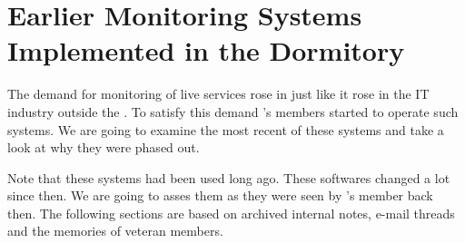 %

\chapter{Earlier Monitoring Systems Implemented in the Dormitory \label{ch1}}

The demand for monitoring of live services rose in \kszkfull just like it rose
in the IT industry outside the \schfull. To satisfy this demand \kszk's members
started to operate such systems. We are going to examine the most recent of
these systems and take a look at why they were phased out.

Note that these systems had been used long ago. These softwares changed a lot
since then. We are going to asses them as they were seen by \kszk's member back
then. The following sections are based on archived internal notes, e-mail
threads and the memories of veteran \kszk members.


